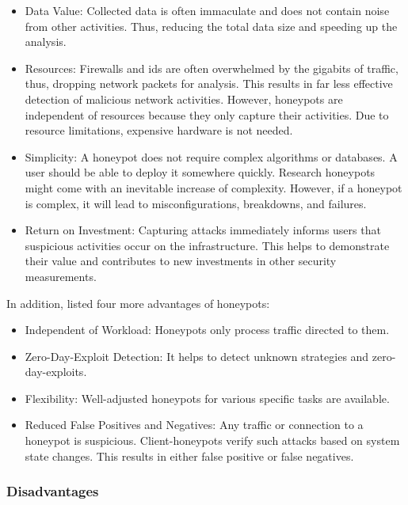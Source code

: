 \begin{itemize}
    \item Data Value: Collected data is often immaculate and does not contain noise from other activities.
          Thus, reducing the total data size and speeding up the analysis.
    \item Resources: Firewalls and \ac{ids} are often overwhelmed by the gigabits of traffic, thus, dropping network packets for analysis.
          This results in far less effective detection of malicious network activities.
          However, honeypots are independent of resources because they only capture their activities.
          Due to resource limitations, expensive hardware is not needed.
    \item Simplicity: A honeypot does not require complex algorithms or databases.
          A user should be able to deploy it somewhere quickly.
          Research honeypots might come with an inevitable increase of complexity.
          However, if a honeypot is complex, it will lead to misconfigurations, breakdowns, and failures.
    \item Return on Investment: Capturing attacks immediately informs users that suspicious activities occur on the infrastructure.
          This helps to demonstrate their value and contributes to new investments in other security measurements.
\end{itemize}

In addition, \citet{NawrockiWSKS2016} listed four more advantages of honeypots:

\begin{itemize}
    \item Independent of Workload: Honeypots only process traffic directed to them.
    \item Zero-Day-Exploit Detection: It helps to detect unknown strategies and zero-day-exploits.
    \item Flexibility: Well-adjusted honeypots for various specific tasks are available.
    \item Reduced False Positives and Negatives: Any traffic or connection to a honeypot is suspicious.
          Client-honeypots verify such attacks based on system state changes.
          This results in either false positive or false negatives.
\end{itemize}

\subsubsection{Disadvantages}


